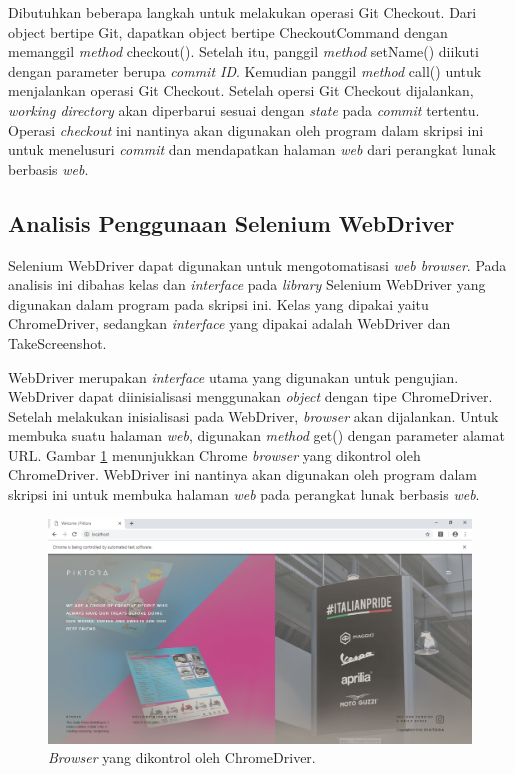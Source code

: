 Dibutuhkan beberapa langkah untuk melakukan operasi Git Checkout. Dari object bertipe Git, dapatkan object bertipe CheckoutCommand dengan memanggil \textit{method} checkout(). Setelah itu, panggil \textit{method} setName() diikuti dengan parameter berupa \textit{commit ID}. Kemudian panggil \textit{method} call() untuk menjalankan operasi Git Checkout. Setelah opersi Git Checkout dijalankan, \textit{working directory} akan diperbarui sesuai dengan \textit{state} pada \textit{commit} tertentu. Operasi \textit{checkout} ini nantinya akan digunakan oleh program dalam skripsi ini untuk menelusuri \textit{commit} dan mendapatkan halaman \textit{web} dari perangkat lunak berbasis \textit{web}.    


\subsection{Analisis Penggunaan Selenium WebDriver}
\label{subsec:analisis_selenium}
Selenium WebDriver dapat digunakan untuk mengotomatisasi \textit{web browser}. Pada analisis ini dibahas kelas dan \textit{interface} pada \textit{library} Selenium WebDriver yang digunakan dalam program pada skripsi ini. 
Kelas yang dipakai yaitu ChromeDriver, sedangkan \textit{interface} yang dipakai adalah WebDriver dan TakeScreenshot. 


WebDriver merupakan \textit{interface} utama yang digunakan untuk pengujian. WebDriver dapat diinisialisasi menggunakan \textit{object} dengan tipe ChromeDriver. Setelah melakukan inisialisasi pada WebDriver, \textit{browser} akan dijalankan. Untuk membuka suatu halaman \textit{web}, digunakan \textit{method} get() dengan parameter alamat URL. Gambar \ref{fig:webdriver} menunjukkan Chrome \textit{browser} yang dikontrol oleh ChromeDriver. WebDriver ini nantinya akan digunakan oleh program dalam skripsi ini untuk membuka halaman \textit{web} pada perangkat lunak berbasis \textit{web}. 

\begin{figure}[H]
	\centering
		\includegraphics[scale=0.4]{Gambar/ChromeDriver.png}
	\caption{\textit{Browser} yang dikontrol oleh ChromeDriver.}
	\label{fig:webdriver}
\end{figure}


